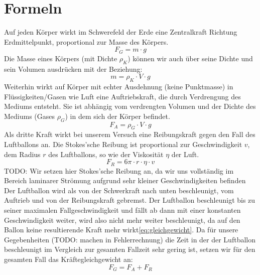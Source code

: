 \documentclass{article}
\begin{document}
    \section{Formeln}
    Auf jeden Körper wirkt im Schwerefeld der Erde eine Zentralkraft Richtung Erdmittelpunkt, proportional zur Masse des Körpers.
    \begin{equation} \label{eq:schwerkraft}
        F_G = m \cdot g    
    \end{equation}
    Die Masse eines Körpers (mit Dichte \(\rho_K\)) können wir auch über seine Dichte und sein Volumen ausdrücken mit der Beziehung:
    \begin{equation} \label{eq:masse_dichte_rel}
        m = \rho_K \cdot V \cdot g
    \end{equation}
    Weiterhin wirkt auf Körper mit echter Ausdehnung (keine Punktmasse) in Flüssigkeiten/Gasen wie Luft eine Auftriebskraft, 
    die durch Verdrengung des Mediums entsteht. Sie ist abhängig vom verdrengten Volumen und der Dichte des Mediums (Gases \(\rho_G\)) in dem sich der Körper befindet.
    \begin{equation} \label{eq:auftrieb}
        F_A = \rho_{G} \cdot V \cdot g
    \end{equation}
    Als dritte Kraft wirkt bei unserem Versuch eine Reibungskraft gegen den Fall des Luftballons an.
    Die Stokes'sche Reibung ist proportional zur Geschwindigkeit \(v\), dem Radius \(r\) des Luftballons, so wie der Viskosität \( \eta \) der Luft.
    \begin{equation} \label{eq:stokes_reibung}
        F_R = 6 \pi \cdot r \cdot \eta \cdot v
    \end{equation}
    TODO: Wir setzen hier Stokes'sche Reibung an, da wir uns vollständig im Bereich laminarer Strömung aufgrund sehr kleiner Geschwindigkeiten befinden
    Der Luftballon wird als von der Schwerkraft nach unten beschleunigt, vom Auftrieb und von der Reibungskraft gebremst.
    Der Luftballon beschleunigt bis zu seiner maximalen Fallgeschwindigkeit\cite{Fall-Luftwiederstand} und fällt ab dann mit einer konstanten Geschwindigkeit weiter,
    wird also nicht mehr weiter beschleunigt, da auf den Ballon keine resultierende Kraft mehr wirkt\ref{eq:gleichgewicht}.
    Da für unsere Gegebenheiten (TODO: machen in Fehlerrechnung) die Zeit in der der Luftballon beschleunigt im Vergleich zur gesamten Fallzeit sehr gering ist,
    setzen wir für den gesamten Fall das Kräftegleichgewicht an:
    \begin{equation} \label{eq:gleichgewicht}
        F_G = F_A + F_R
    \end{equation}
\end{document}
